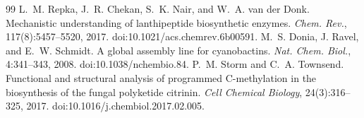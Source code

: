 \documentclass[11pt]{article}
\theoremstyle{definition}
\begin{document}
\begin{thebibliography}{99}
 L.~M. Repka, J.~R. Chekan, S.~K. Nair, and W.~A. van der Donk.
Mechanistic understanding of lanthipeptide biosynthetic enzymes. \emph{Chem. Rev.}, 117(8):5457--5520,
2017. doi:10.1021/acs.chemrev.6b00591.
 M.~S. Donia, J. Ravel, and E.~W. Schmidt. A global assembly line
for cyanobactins. \emph{Nat. Chem. Biol.}, 4:341--343, 2008. doi:10.1038/nchembio.84.
 P.~M. Storm and C.~A. Townsend.
Functional and structural analysis of programmed C-methylation in the biosynthesis of the fungal polyketide
citrinin. \emph{Cell Chemical Biology}, 24(3):316--325, 2017. doi:10.1016/j.chembiol.2017.02.005.
\end{thebibliography}
\end{document}
